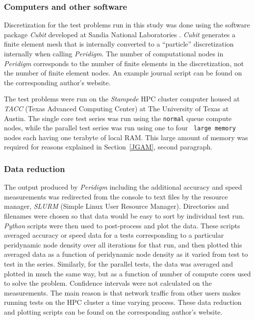 \documentclass[preprint,12pt]{elsarticle}
\begin{document}
\subsubsection{Computers and other software} 
%
Discretization for the test problems run in this study was done using the
software package \emph{Cubit} developed at Sandia National Laboratories
\cite{ref-Cubit}. \emph{Cubit} generates a finite element mesh that is
internally converted to a ``particle'' discretization internally when calling
\emph{Peridigm}. The number of computational nodes in \emph{Peridigm}
corresponds to the number of finite elements in the discretization, not the
number of finite element nodes.  An example journal script can be found on the
corresponding author's website. 

The test problems were run on the \emph{Stampede} HPC cluster computer housed
at \emph{TACC} (Texas Advanced Computing Center) at The University of Texas at
Austin. The single core test series was run using the {\tt normal} queue
compute nodes, while the parallel test series was run using one to four {\tt
large memory} nodes each having one terabyte of local RAM. This large amount of
memory was required for reasons explained in Section~\ref{JGAM}, second paragraph.  

\subsubsection{Data reduction} 

The output produced by \emph{Peridigm} including the additional accuracy and
speed measurements was redirected from the console to text files by the
resource manager, \emph{SLURM} (Simple Linux User Resource Manager).
Directories and filenames were chosen so that data would be easy to sort by
individual test run.  \emph{Python} scripts were then used to post-process and
plot the data. These scripts averaged accuracy or speed data for a tests
corresponding to a particular peridynamic node density over all iterations for
that run, and then plotted this averaged data  as a function of peridynamic
node density as it varied from test to test in the series.  Similarly, for the
parallel tests, the data was averaged and plotted in much the same way, but as
a function of number of compute cores used to solve the problem. Confidence
intervals were not calculated on the measurements. The main reason is that
network traffic from other users makes running tests on the HPC cluster a time
varying process. These data reduction and plotting scripts can be found on the
corresponding author's website.
\end{document}
